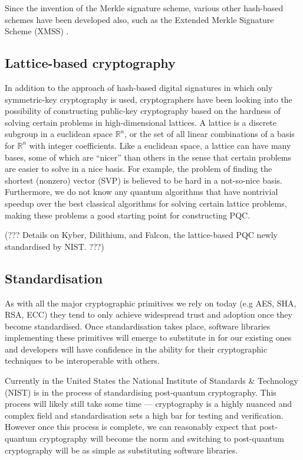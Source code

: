 Since the invention of the Merkle signature scheme, various other hash-based schemes have been developed also, such as the Extended Merkle Signature Scheme (XMSS) \cite{bib:XMSS}.

\subsection{Lattice-based cryptography} \label{lattice-based-cryptography}

In addition to the approach of hash-based digital signatures in which only symmetric-key cryptography is used, cryptographers have been looking into the possibility of constructing public-key cryptography based on the hardness of solving certain problems in high-dimensional lattices.  A lattice is a discrete subgroup in a euclidean space $\mathbb R^n$, or the set of all linear combinations of a basis for $\mathbb R^n$ with integer coefficients.  Like a euclidean space, a lattice can have many bases, some of which are ``nicer'' than others in the sense that certain problems are easier to solve in a nice basis.  For example, the problem of finding the shortest (nonzero) vector (SVP) is believed to be hard in a not-so-nice basis.  Furthermore, we do not know any quantum algorithms that have nontrivial speedup over the best classical algorithms for solving certain lattice problems, making these problems a good starting point for constructing PQC.

(??? Details on Kyber, Dilithium, and Falcon, the lattice-based PQC newly standardised by NIST. ???)

\subsection{Standardisation} \label{standardisation}

As with all the major cryptographic primitives we rely on today (e.g AES, SHA, RSA, ECC) they tend to only achieve widespread trust and adoption once they become standardised. Once standardisation takes place, software libraries implementing these primitives will emerge to substitute in for our existing ones and developers will have confidence in the ability for their cryptographic techniques to be interoperable with others.

Currently in the United States the National Institute of Standards \& Technology (NIST) is in the process of standardising post-quantum cryptography. This process will likely still take some time --- cryptography is a highly nuanced and complex field and standardisation sets a high bar for testing and verification. However once this process is complete, we can reasonably expect that post-quantum cryptography will become the norm and switching to post-quantum cryptography will be as simple as substituting software libraries.

